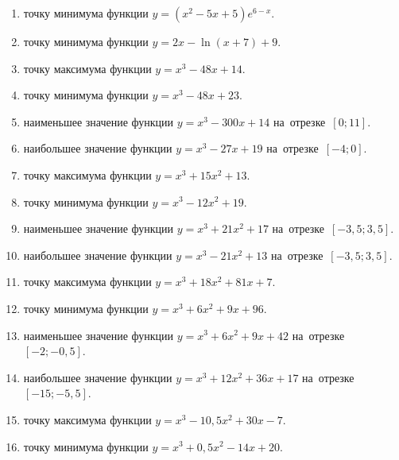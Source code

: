 \documentclass[a4paper,10pt]{article}
\begin{document}
\begin{enumerate}
\item {} точку минимума функции $y=\left(x^2-5x+5\right){{e}^{6-x}}$.

\item {} точку минимума функции $y=2x-\ln \left(x+7\right)+9$.

\item {} точку максимума функции $y=x^3 -48x +14$.

\item {} точку минимума функции $y=x^3 -48x+23$.

\item {} наименьшее значение функции $y=x^3 -300x+14$ на~отрезке~$\left[0;11\right]$.

\item {} наибольшее значение функции $y=x^3 -27x+19$ на~отрезке~$\left[-4;0\right]$.

\item {} точку максимума функции $y=x^3 +15x^2+13$.

\item {} точку минимума функции $y=x^3 -12x^2+19$.

\item {} наименьшее значение функции $y=x^3 +21x^2+17$ на~отрезке~$\left[-3,5;3,5\right]$.

\item {} наибольшее значение функции $y=x^3 -21x^2+13$ на~отрезке~$\left[-3,5;3,5\right]$.

\item {} точку максимума функции $y=x^3 +18x^2+81x+7$.

\item {} точку минимума функции $y=x^3 +6x^2+9x+96$.

\item {} наименьшее значение функции $y=x^3 +6x^2+9x+42$ на~отрезке~$\left[-2;-0,5\right]$.

\item {} наибольшее значение функции $y=x^3 +12x^2+36x+17$ на~отрезке~$\left[-15;-5,5\right]$.

\item {} точку максимума функции $y=x^3 -10,5x^2+30x-7$.

\item {} точку минимума функции $y=x^3 +0,5x^2-14x+20$.


\end{enumerate}
\end{document}
